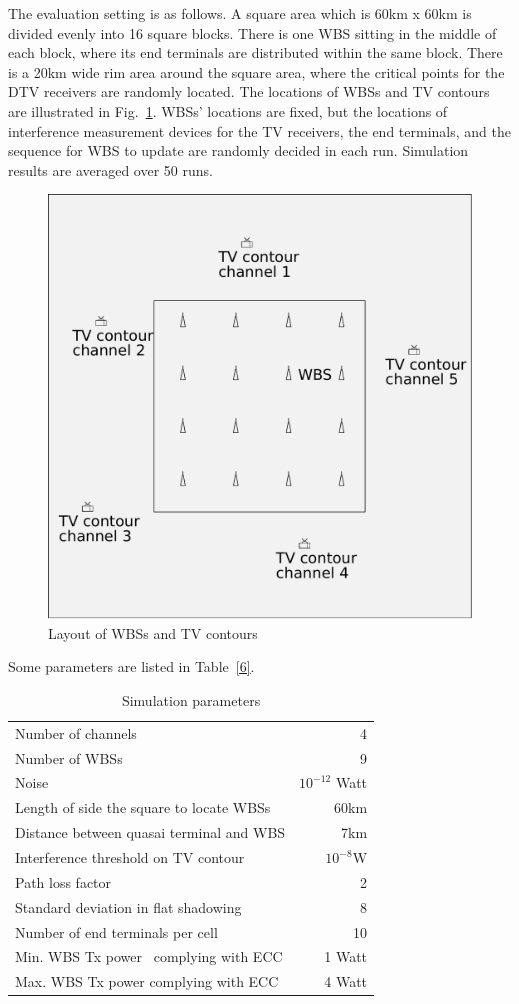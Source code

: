 \documentclass[times]{ettauth}
\theoremstyle{mytheoremstyle}
\theoremstyle{mytheoremstyle}
\theoremstyle{mytheoremstyle}
\begin{document}
The evaluation setting is as follows.
A square area which is 60km x 60km is divided evenly into 16 square blocks.
There is one WBS sitting in the middle of each block,  where its end terminals are distributed within the same block.
There is a 20km wide rim area around the square area, where the critical points for the DTV receivers are randomly located.
The locations of WBSs and TV contours are illustrated in Fig.~\ref{sim:layout}.
WBSs' locations are fixed, but the locations of interference measurement devices for the TV receivers, the end terminals, and the sequence for WBS to update are randomly decided in each run.
Simulation results are averaged over 50 runs.

\begin{figure}[h!]
  \centering
  \includegraphics[width=0.5\linewidth]{layout.pdf}
  \caption{Layout of WBSs and TV contours}
  \label{sim:layout}
\end{figure}

Some parameters are listed in Table~\ref{6}.

\begin{table}[!h]
\centering
\begin{tabular}{|l|r|}
  \hline
  Number of channels 						& 4 \\
  Number of WBSs							& 9\\
  Noise 									& $10^{-12}$ Watt \\ %
  Length of side the square to locate WBSs		& 60km\\
  Distance between quasai terminal and WBS 	& 7km \\
  Interference threshold on TV contour 		& $10^{-8}$W \\ %
  Path loss factor 							& 2 \\
  Standard deviation in flat shadowing		& 8\\
  Number of end terminals per cell 		& 10 \\
  Min. WBS Tx power~\footnotemark{} complying with ECC 			& 1 Watt \\
  Max. WBS Tx power complying with ECC			& 4 Watt \\

  \hline
\end{tabular}
\caption{Simulation parameters}
\label{simulationparameter}
\end{table}
\end{document}
